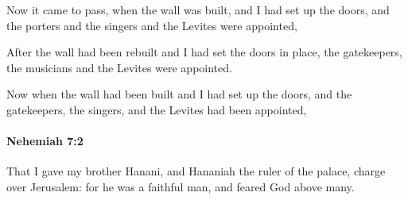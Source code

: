 			\begin{versebox}
					\item[BHS] 
					\item[LXX] 
					\item[ASV] Now it came to pass, when the wall was built, and I had set up the doors, and the porters and the singers and the Levites were appointed,
					\item[NIV] After the wall had been rebuilt and I had set the doors in place, the gatekeepers, the musicians and the Levites were appointed.
					\item[NRSV] Now when the wall had been built and I had set up the doors, and the gatekeepers, the singers, and the Levites had been appointed,
			\end{versebox}

		\paragraph{Nehemiah 7:2} %
			\label{NEHEMIAH-7-2}

			That I gave my brother Hanani, and Hananiah the ruler of the palace, charge over Jerusalem: for he was a faithful man, and feared God above many.


